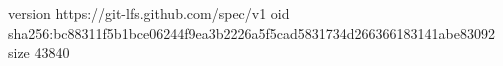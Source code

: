 version https://git-lfs.github.com/spec/v1
oid sha256:bc88311f5b1bce06244f9ea3b2226a5f5cad5831734d266366183141abe83092
size 43840
